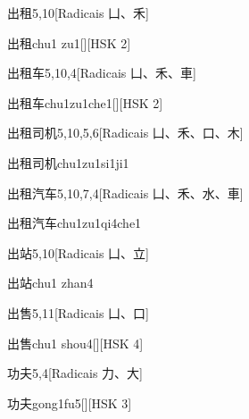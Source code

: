 \begin{entry}{出租}{5,10}[Radicais ⼐、⽲]
  \begin{phonetics}{出租}{chu1 zu1}[][HSK 2]
  \end{phonetics}
\end{entry}

\begin{entry}{出租车}{5,10,4}[Radicais ⼐、⽲、⾞]
  \begin{phonetics}{出租车}{chu1zu1che1}[][HSK 2]
  \end{phonetics}
\end{entry}

\begin{entry}{出租司机}{5,10,5,6}[Radicais ⼐、⽲、⼝、⽊]
  \begin{phonetics}{出租司机}{chu1zu1si1ji1}
  \end{phonetics}
\end{entry}

\begin{entry}{出租汽车}{5,10,7,4}[Radicais ⼐、⽲、⽔、⾞]
  \begin{phonetics}{出租汽车}{chu1zu1qi4che1}
  \end{phonetics}
\end{entry}

\begin{entry}{出站}{5,10}[Radicais ⼐、⽴]
  \begin{phonetics}{出站}{chu1 zhan4}
  \end{phonetics}
\end{entry}

\begin{entry}{出售}{5,11}[Radicais ⼐、⼝]
  \begin{phonetics}{出售}{chu1 shou4}[][HSK 4]
  \end{phonetics}
\end{entry}

\begin{entry}{功夫}{5,4}[Radicais ⼒、⼤]
  \begin{phonetics}{功夫}{gong1fu5}[][HSK 3]
  \end{phonetics}
\end{entry}

